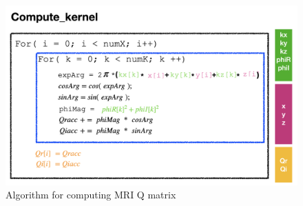 \begin{figure}[t]
\centering
\captionsetup{justification=centering, format=hang}
\includegraphics[width=0.85\columnwidth]{figure/algorithm.png}
\caption{Algorithm for computing MRI Q matrix~\cite{stone2008accelerating}}
\label{fig-1}
\end{figure}
